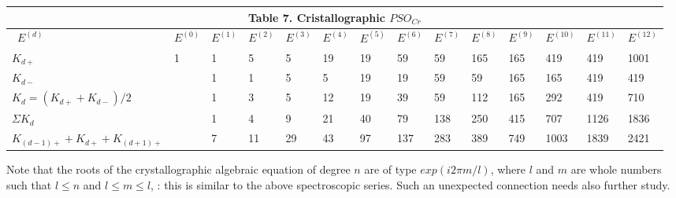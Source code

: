 \documentclass[a4paper,9pt]{article}
\begin{document}
\begin{table}
  \hskip-1.0cm\begin{tabular}{llllllllllllll}
    \toprule
    \multicolumn{14}{c}{Table 7. Cristallographic $PSO_{Cr}$}                  \\
    \cmidrule(r){1-14}
    \midrule
    
     
     
      
      \ $E^{(d)}$ & $E^{(0)}$ & $E^{(1)} $ & $E^{(2)}$ & $E^{(3)} $& $E^{(4)}$ &$ E^{(5)}$ &$ E^{(6)} $&$ E^{(7)}$ &$ E^{(8)}$ & $E^{(9)}$ &$ E^{(10)} $&$ E^{(11)} $&$ E^{(12)}$ \\
    \midrule
    $K_{d+}$  & 1 & 1 & 5 & 5 & 19 & 19 & 59 & 59 & 165 & 165 & 419 & 419 & 1001 \\
    
     $K_{d-}$  &  & 1 & 1 & 5 & 5 & 19 & 19 & 59 & 59 & 165 & 165& 419 & 419 \\
     
      $K_{d} = (K_{d+} + K_{d-})/2$  & & 1 & 3 & 5 & 12 & 19 & 39 & 59 & 112 & 165 & 292 & 419 & 710 \\
      
      $\Sigma K_{d}$ &  & 1 & 4 & 9 & 21 & 40 & 79 & 138 & 250 & 415 & 707 & 1126 & 1836 \\
      
      $K_{(d-1)+} +K_{d+}+ K_{(d+1)+}$  &  & 7 & 11 & 29 & 43 & 97 & 137 & 283 & 389 & 749 & 1003 & 1839 & 2421 \\

      

    \bottomrule
  \end{tabular}
  \label{tab:table}
\end{table}

Note that the roots of the crystallographic algebraic equation of degree $n$ are of type $exp(i2\pi m/l)$, where $l$ and $m$ are whole numbers such that $l \leq n$ and $l \leq m \leq l$,  : this is similar to the above spectroscopic series. Such an unexpected connection needs also further study.
\end{document}
